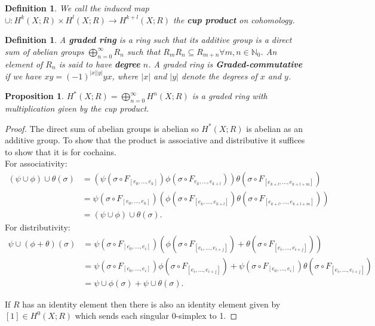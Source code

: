 \documentclass{article}
\newtheorem{definition}[theorem]{Definition}
\newtheorem{proposition}[theorem]{Proposition}
\begin{document}
\begin{definition}
We call the induced map $\cup:H^k(X;R)\times H^l(X;R)\to H^{k+l}(X;R)$ the \textbf{cup product} on cohomology.
\end{definition}

\begin{definition}
A \textbf{graded ring} is a ring such that its additive group is a direct sum of abelian groups $\bigoplus_{n=0}^\infty R_n$ such that $R_mR_n\subseteq R_{m+n}\forall m,n\in\mathbb{N}_0$. An element of $R_n$ is said to have \textbf{degree} $n$. A graded ring is \textbf{Graded-commutative} if we have $xy=(-1)^{|x||y|}yx$, where $|x|$ and $|y|$ denote the degrees of $x$ and $y$.
\end{definition}

\begin{proposition}
$H^*(X;R)=\bigoplus_{n=0}^\infty H^n(X;R)$ is a graded ring with multiplication given by the cup product.
\end{proposition}
\begin{proof}
The direct sum of abelian groups is abelian so $H^*(X;R)$ is abelian as an additive group.
To show that the product is associative and distributive it suffices to show that it is for cochains.\\
For associativity:
\begin{align*}
(\psi\cup\phi)\cup\theta(\sigma)&=(\psi(\sigma\circ F_{[e_0,...,e_k]})\phi(\sigma\circ F_{e_k,...,e_{k+l}}))\theta(\sigma\circ F_{[e_{k+l},...,e_{k+l+m}]})\\&=\psi(\sigma\circ F_{[e_0,...,e_k]})(\phi(\sigma\circ F_{[e_k,...,e_{k+l}]})\theta(\sigma\circ F_{[e_{k+l},...,e_{k+l+m}]}))\\&=(\psi\cup\phi)\cup\theta(\sigma).
\end{align*}
For distributivity:
\begin{align*}
\psi\cup(\phi+\theta)(\sigma)&=\psi(\sigma\circ F_{[e_0,...,e_i]})(\phi(\sigma\circ F_{[e_i,...,e_{i+j}]})+\theta(\sigma\circ F_{[e_i,...,e_{i+j}]}))\\&=\psi(\sigma\circ F_{[e_0,...,e_i]})\phi(\sigma\circ F_{[e_i,...,e_{i+j}]})+\psi(\sigma\circ F_{[e_0,...,e_i]})\theta(\sigma\circ F_{[e_i,...,e_{i+j}]})\\&=\psi\cup\phi(\sigma)+\psi\cup\theta(\sigma).
\end{align*}


\noindent If $R$ has an identity element then there is also an identity element given by $[1]\in H^0(X;R)$ which sends each singular 0-simplex to 1.
\end{proof}
\end{document}
